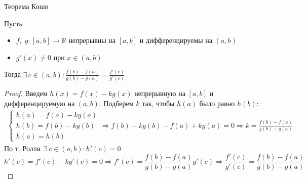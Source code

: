 \begin{theorem-non}
    Теорема Коши

    Пусть
    \begin{itemize}
        \item $f, \; g: [a, b] \to \mathbb{R}$ непрерывны на $[a, b]$ и дифференцируемы на $(a, b)$
        \item $g'(x) \neq 0$ при $x \in (a, b)$
    \end{itemize}
    Тогда $\exists \, c \in (a, b) : \frac{f(b) - f(a)}{g(b) - g(a)} = \frac{f'(c)}{g'(c)}$
\end{theorem-non}
\begin{proof}
    Введем $h(x) = f(x) - kg(x)$ непрерывную на $[a, b]$ и дифференцируемую на $(a, b)$. Подберем $k$ так, чтобы $h(a)$ было равно $h(b)$:
    \begin{gather*}
        \begin{cases}
            h(a) = f(a) - kg(a) \\
            h(b) = f(b) - kg(b) \\
            h(a) = h(b)
        \end{cases} 
        \Rightarrow f(b) - kg(b) - f(a) + kg(a) = 0 \Rightarrow k = \frac{f(b) - f(a)}{g(b) - g(a)}
    \end{gather*}
    По т. Ролля $\, \exists \, c \in (a, b): h'(c) = 0$
    \[ h'(c) = f'(c) - kg'(c) = 0 \Rightarrow f'(c) = \frac{f(b) - f(a)}{g(b) - g(a)} g'(c) \Rightarrow \frac{f'(c)}{g'(c)} = \frac{f(b) - f(a)}{g(b) - g(a)} \]
\end{proof}